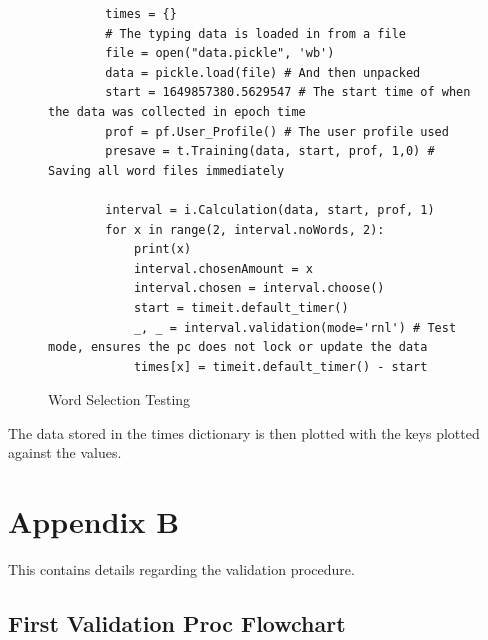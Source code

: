 \documentclass[10pt,a4paper]{report}
\begin{document}
\begin{figure}[h!]
	\begin{lstlisting}
		times = {}
		# The typing data is loaded in from a file
		file = open("data.pickle", 'wb')
		data = pickle.load(file) # And then unpacked
		start = 1649857380.5629547 # The start time of when the data was collected in epoch time
		prof = pf.User_Profile() # The user profile used
		presave = t.Training(data, start, prof, 1,0) # Saving all word files immediately
		
		interval = i.Calculation(data, start, prof, 1)
		for x in range(2, interval.noWords, 2):
			print(x)
			interval.chosenAmount = x
			interval.chosen = interval.choose()
			start = timeit.default_timer()
			_, _ = interval.validation(mode='rnl') # Test mode, ensures the pc does not lock or update the data
			times[x] = timeit.default_timer() - start
	\end{lstlisting}
	\caption{Word Selection Testing}
	\label{fig:selTest}
\end{figure}

The data stored in the times dictionary is then plotted with the keys plotted against the values.

\chapter*{Appendix B}

This contains details regarding the validation procedure.

\section*{First Validation Proc Flowchart}
\end{document}
